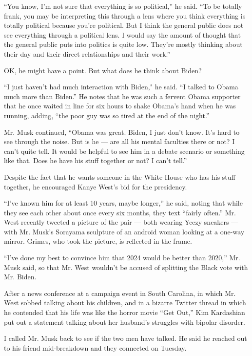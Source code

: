 ``You know, I'm not sure that everything is so political,'' he said.
``To be totally frank, you may be interpreting this through a lens where
you think everything is totally political because you're political. But
I think the general public does not see everything through a political
lens. I would say the amount of thought that the general public puts
into politics is quite low. They're mostly thinking about their day and
their direct relationships and their work.''

OK, he might have a point. But what does he think about Biden?

``I just haven't had much interaction with Biden," he said. ``I talked
to Obama much more than Biden.'' He notes that he was such a fervent
Obama supporter that he once waited in line for six hours to shake
Obama's hand when he was running, adding, ``the poor guy was so tired at
the end of the night.''

Mr. Musk continued, ``Obama was great. Biden, I just don't know. It's
hard to see through the noise. But is he --- are all his mental
faculties there or not? I can't quite tell. It would be helpful to see
him in a debate scenario or something like that. Does he have his stuff
together or not? I can't tell.''

Despite the fact that he wants someone in the White House who has his
stuff together, he encouraged Kanye West's bid for the presidency.

``I've known him for at least 10 years, maybe longer,'' he said, noting
that while they see each other about once every six months, they text
``fairly often.'' Mr. West recently tweeted a picture of the pair ---
both wearing Yeezy sneakers --- with Mr. Musk's Sorayama sculpture of an
android woman looking at a one-way mirror. Grimes, who took the picture,
is reflected in the frame.

``I've done my best to convince him that 2024 would be better than
2020,'' Mr. Musk said, so that Mr. West wouldn't be accused of splitting
the Black vote with Mr. Biden.

After a news conference at a campaign event in South Carolina, in which
Mr. West sobbed talking about his children, and in a bizarre Twitter
thread in which he contended that his life was like the horror movie
``Get Out,'' Kim Kardashian put out a statement talking about her
husband's struggles with bipolar disorder.

I called Mr. Musk back to see if the two men have talked. He said he
reached out to his friend mid-breakdown and they connected on Tuesday.

